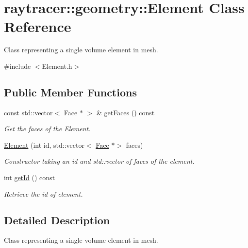 \hypertarget{classraytracer_1_1geometry_1_1Element}{}\section{raytracer\+:\+:geometry\+:\+:Element Class Reference}
\label{classraytracer_1_1geometry_1_1Element}


Class representing a single volume element in mesh.  




{\ttfamily \#include $<$Element.\+h$>$}

\subsection*{Public Member Functions}
\begin{DoxyCompactItemize}
\item 
const std\+::vector$<$ \hyperlink{classraytracer_1_1geometry_1_1Face}{Face} $\ast$ $>$ \& \hyperlink{classraytracer_1_1geometry_1_1Element_aed405192c2fa9b6488b2be4c78701062}{get\+Faces} () const
\begin{DoxyCompactList}\small\item\em Get the faces of the \hyperlink{classraytracer_1_1geometry_1_1Element}{Element}. \end{DoxyCompactList}\item 
\hyperlink{classraytracer_1_1geometry_1_1Element_a689702f3ea97c81b216759a43cfa1ffe}{Element} (int id, std\+::vector$<$ \hyperlink{classraytracer_1_1geometry_1_1Face}{Face} $\ast$$>$ faces)
\begin{DoxyCompactList}\small\item\em Constructor taking an id and std\+::vector of faces of the element. \end{DoxyCompactList}\item 
int \hyperlink{classraytracer_1_1geometry_1_1Element_ad0780e2bf5e9b3f6918838e9db384e5f}{get\+Id} () const
\begin{DoxyCompactList}\small\item\em Retrieve the id of element. \end{DoxyCompactList}\end{DoxyCompactItemize}


\subsection{Detailed Description}
Class representing a single volume element in mesh. 

